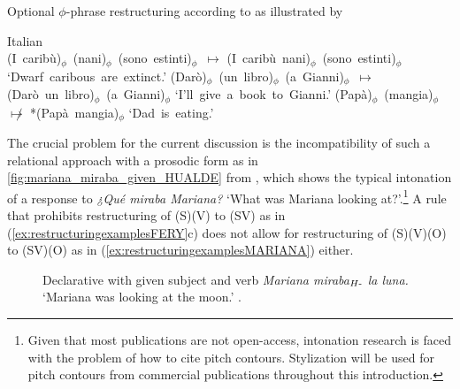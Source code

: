 \begin{exe}
\ex\label{ex:restructuringexamplesFERY} Optional $\phi$-phrase restructuring according to \citet{Nespor2007} as illustrated by \citet[67]{Fery.2017}
\begin{xlist}
\ex Italian\\
(I~caribù)$_\phi$~(nani)$_\phi$~(sono~estinti)$_\phi$~$\longmapsto$ (I~caribù~nani)$_\phi$~(sono~estinti)$_\phi$ 
\glt  `Dwarf~caribous~are~extinct.'
\ex 
(Darò)$_\phi$~(un~libro)$_\phi$~(a~Gianni)$_\phi$~$\longmapsto$ (Darò~un~libro)$_\phi$~(a~Gianni)$_\phi$ 
\glt `I'll~give~a~book~to~Gianni.' 
\ex 
(Papà)$_\phi$~(mangia)$_\phi$~$\not\longmapsto$ *(Papà~mangia)$_\phi$ 
\glt`Dad~is~eating.'
\end{xlist}
\end{exe}

The crucial problem for the current discussion is the incompatibility of such a relational approach with a prosodic form as in \autoref{fig:mariana_miraba_given_HUALDE} from \citet[269]{Hualde.2014}, which shows the typical intonation of a response to \textit{¿Qué miraba Mariana?} `What was Mariana looking at?'.\footnote{Given that most publications are not open-access, intonation research is faced with the problem of how to cite pitch contours. Stylization will be used for pitch contours from commercial publications throughout this introduction.} A rule that prohibits restructuring of (S)(V) to (SV) as in (\ref{ex:restructuringexamplesFERY}c) does not allow for restructuring of (S)(V)(O) to (SV)(O) as in (\ref{ex:restructuringexamplesMARIANA}) either.\largerpage[-1]


\begin{figure}
\caption{Declarative with given subject and verb \textit{Mariana miraba$_{H\textnormal{-}}$ la luna.} `Mariana was looking at the moon.' \citep[269]{Hualde.2014}.\label{fig:mariana_miraba_given_HUALDE}}
\end{figure}

